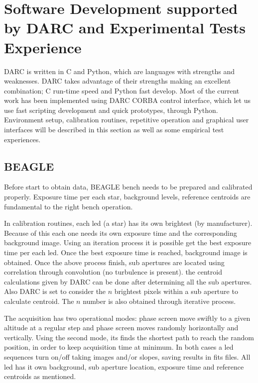 \documentclass[]{spie}  %
\begin{document}
\newpage
\section{Software Development supported by DARC and Experimental Tests Experience} \label{sec:LL}
DARC is written in C and Python, which are languages with strengths and
weaknesses. DARC takes advantage of their strengths making an excellent
combination; C run-time speed and Python fast develop. Most of the current work
has been implemented using DARC CORBA control interface, which let us use fast
scripting development and quick prototypes, through Python. Environment setup,
          calibration routines, repetitive operation and graphical user
          interfaces will be described in this section as well as some
          empirical test experiences.

\subsection{BEAGLE}
Before start to obtain data, BEAGLE bench needs to be prepared and calibrated
properly. Exposure time per each star, background levels, reference centroids
are fundamental to the right bench operation.

In calibration routines, each led (a star) has its own brightest (by
manufacturer). Because of this each one needs its own exposure time and the
corresponding background image. Using an iteration process it is possible get
the best exposure time per each led. Once the best exposure time is reached,
background image is obtained. Once the above process finish, sub apertures are
located using correlation through convolution (no turbulence is present). the
centroid calculations given by DARC can be done after determining all the sub
apertures. Also DARC is set to consider the $n$ brightest pixels within a sub
aperture to calculate centroid.\cite{basden2012wavefront} The $n$ number is
also obtained through iterative process.

The acquisition has two operational modes: phase screen move swiftly to a given
altitude at a regular step and phase screen moves randomly horizontally and
vertically. Using the second mode, its finds the shortest path to reach the
random position, in order to keep acquisition time at minimum. In both cases a
led sequences turn on/off taking images and/or slopes, saving results in fits
files. All led has it own background, sub aperture location, exposure time and
reference centroids as mentioned.
\end{document}

